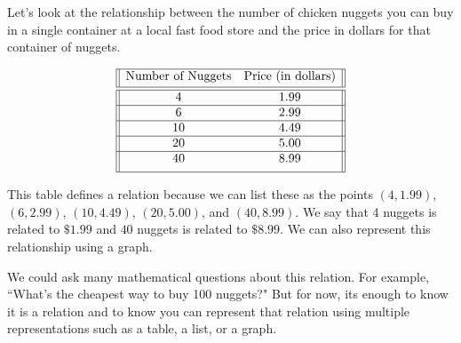 \documentclass[nooutcomes]{ximera}
\begin{document}
\begin{example}
Let's look at the relationship between the number of chicken nuggets
you can buy in a single container at a local fast food store and the
price in dollars for that container of nuggets.

$$
 \begin{array}{||c c||} 
 \hline
 \text{Number of Nuggets} & \text{Price (in dollars)} \\[0.5ex] 
 \hline\hline
 4 & 1.99\\ 
 \hline
 6 & 2.99 \\
 \hline
 10 & 4.49\\
 \hline
 20 & 5.00 \\
 \hline
 40 & 8.99\\[1ex] 
 \hline
\end{array}
$$

\begin{explanation}
This table defines a relation because we can list these as the points $(4,1.99)$, $(6,2.99)$, $(10,4.49)$, $(20,5.00)$, and $(40, 8.99)$.  We say that 4 nuggets is related to $\$1.99$ and $40$ nuggets is related to $\$8.99$.  We can also represent this relationship using a graph.

\begin{image}
\end{image}

We could ask many mathematical questions about this relation.  For example, ``What's the cheapest way to buy 100 nuggets?"  But for now, its enough to know it is a relation and to know you can represent that relation using multiple representations such as a table, a list, or a graph.
\end{explanation}
\end{example}
\end{document}
